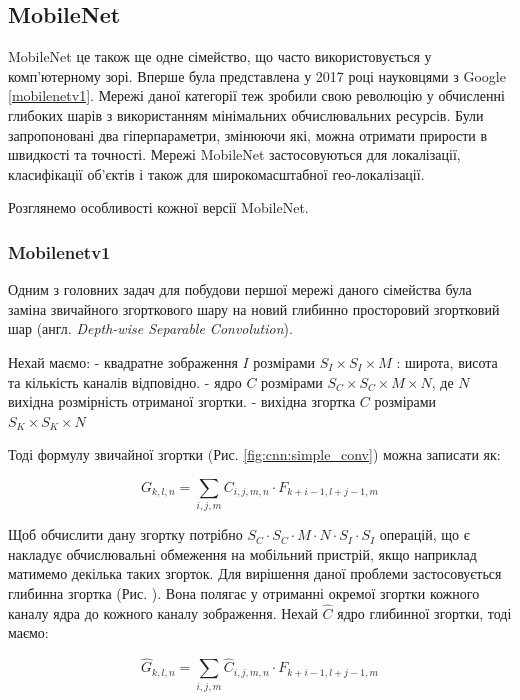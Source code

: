 \subsection{MobileNet}

MobileNet це також ще одне сімейство, що часто використовується у комп'ютерному зорі.
Вперше була представлена у 2017 році науковцями з Google \ref{mobilenetv1}.
Мережі даної категорії теж зробили свою революцію у обчисленні глибоких шарів з
використанням мінімальних обчислювальних ресурсів. Були запропоновані два гіперпараметри,
змінюючи які, можна отримати прирости в швидкості та точності. Мережі MobileNet
застосовуються для локалізації, класифікації об'єктів і також для широкомасштабної
гео-локалізації.

Розглянемо особливості кожної версії MobileNet.

\subsubsection{Mobilenetv1}

Одним з головних задач для побудови першої мережі даного сімейства була заміна
звичайного згорткового шару на новий глибинно просторовий згортковий шар
(англ. \textit{Depth-wise Separable Convolution}).

Нехай маємо:
- квадратне зображення $I$ розмірами $S_I \times S_I \times M$ : широта, висота та
кількість каналів відповідно.
- ядро $C$ розмірами $S_C \times S_C \times M \times N$, де $N$ вихідна розмірність
отриманої згортки.
- вихідна згортка $C$ розмірами $S_K \times S_K \times N$

Тоді формулу звичайної згортки (Рис. \ref{fig:cnn:simple_conv}) можна записати як:

\begin{equation}
    G_{k,l,n} = \sum_{i,j,m} C_{i,j,m,n} · F_{k+i-1, l+j-1,m}
    \label{eq:simple_conv}
\end{equation}

Щоб обчислити дану згортку потрібно $S_C · S_C · M · N · S_I · S_I$ операцій, що
є накладує обчислювальні обмеження на мобільний пристрій, якщо наприклад матимемо
декілька таких згорток.
Для вирішення даної проблеми застосовується глибинна згортка (Рис. ). Вона полягає
у отриманні окремої згортки кожного каналу ядра до кожного каналу
зображення.
Нехай $\widehat{C}$ ядро глибинної згортки, тоді маємо:

\begin{equation}
    \widehat{G}_{k,l,n} = \sum_{i,j,m} \widehat{C}_{i,j,m,n} · F_{k+i-1, l+j-1,m}
    \label{eq:deep_wise_conv}
\end{equation}

